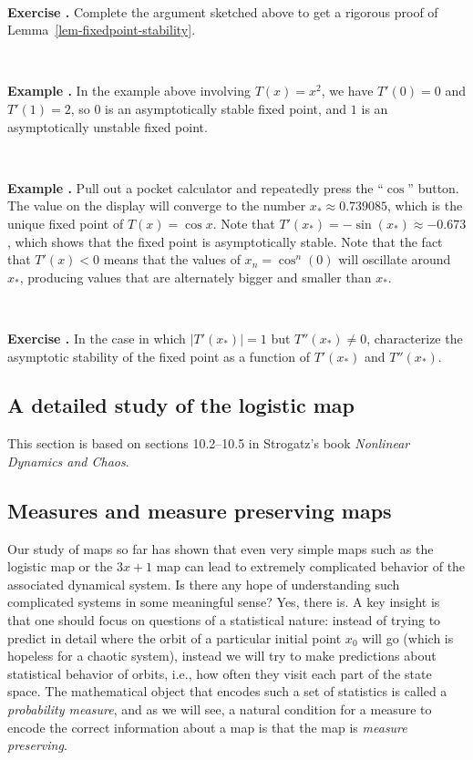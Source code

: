 \documentclass[12pt]{amsart}
\newcounter{example}
\newcounter{exercise}
\newcommand{\beginexam}{\ \\ \addtocounter{example}{1} \textbf{Example \arabic{example}.} }
\newcommand{\beginexer}{\ \\ \addtocounter{exercise}{1} \textbf{Exercise \arabic{exercise}.} }
\begin{document}
\beginexer Complete the argument sketched above to get a rigorous proof of Lemma~\ref{lem-fixedpoint-stability}.

\beginexam In the example above involving $T(x)=x^2$, we have $T'(0)=0$ and $T'(1)=2$, so $0$ is an asymptotically stable fixed point, and $1$ is an asymptotically unstable fixed point.

\beginexam Pull out a pocket calculator and repeatedly press the ``$\cos$'' button.
 The value on the display will converge to the number $x_*\approx0.739085$, which is the unique fixed point of $T(x)=\cos x$. Note that $T'(x_*)=-\sin(x_*)\approx -0.673$, which shows that the fixed point is asymptotically stable. Note that the fact that $T'(x)<0$ means that the values of $x_n=\cos^n(0)$ will oscillate around $x_*$, producing values that are alternately bigger and smaller than $x_*$.

\beginexer In the case in which $|T'(x_*)|=1$ but $T''(x_*)\neq 0$, characterize the asymptotic stability of the fixed point as a function of $T'(x_*)$ and $T''(x_*)$.


\subsection{A detailed study of the logistic map}

This section is based on sections 10.2--10.5 in Strogatz's book \emph{Nonlinear Dynamics and Chaos}.

\subsection{Measures and measure preserving maps}

Our study of maps so far has shown that even very simple maps such as the logistic map or the $3x+1$ map can lead to extremely complicated behavior of the associated dynamical system. Is there any hope of understanding such complicated systems in some meaningful sense? Yes, there is. A key insight is that one should focus on questions of a statistical nature: instead of trying to predict in detail where the orbit of a particular initial point $x_0$ will go (which is hopeless for a chaotic system), instead we will try to make predictions about statistical behavior of orbits, i.e., how often they visit each part of the state space. The mathematical object that encodes such a set of statistics is called a \emph{probability measure}, and as we will see, a natural condition for a measure to encode the correct information about a map is that the map is \emph{measure preserving}.
\end{document}
